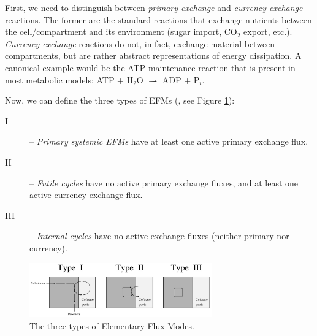 \documentclass[10pt,a4paper]{article}
\begin{document}
First, we need to distinguish between \textit{primary exchange} and \textit{currency exchange} reactions. The former are the standard reactions that exchange nutrients between the cell/compartment and its environment (sugar import, CO$_2$ export, etc.). \textit{Currency exchange} reactions do not, in fact, exchange material between compartments, but are rather abstract representations of energy dissipation. A canonical example would be the ATP maintenance reaction that is present in most metabolic models: ATP + H$_2$O $\rightharpoonup$ ADP + P$_i$.

Now, we can define the three types of EFMs (\cite{price_extreme_2002}, see Figure \ref{fig:efm_types}):
\begin{description}
	\item[I] -- \textit{Primary systemic EFMs} have at least one active primary exchange flux.
	\item[II] -- \textit{Futile cycles} have no active primary exchange fluxes, and at least one active currency exchange flux.
	\item[III] -- \textit{Internal cycles} have no active exchange fluxes (neither primary nor currency). 
\end{description}

\begin{figure}[ht!]
	\begin{center}	\includegraphics[width=0.7\textwidth]{extreme_pathway_types}
	\caption{The three types of Elementary Flux Modes.}\label{fig:efm_types}
	\end{center}
\end{figure}
\end{document}
